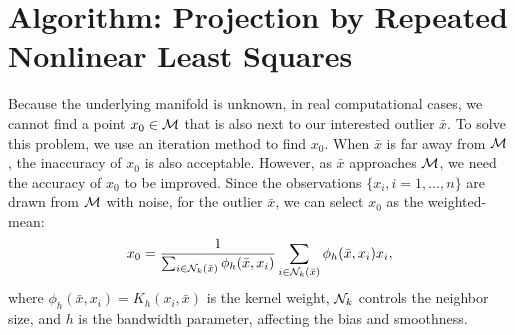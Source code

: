 \documentclass{article}
\newtheorem{theorem}{Theorem}[section]
\theoremstyle{remark}
\begin{document}
%
%
\section{Algorithm: Projection by Repeated Nonlinear Least Squares}\label{nonlinear projection}
Because the underlying manifold is unknown, in real computational cases,  we cannot find a point $x_0\in \cal M$ that is also next to our interested outlier $\bar{x}$. To solve this problem, we use an iteration method to find $x_0$. When $\bar{x}$ is far away from $\cal M$, the inaccuracy of $x_0$ is also acceptable. However, as $\bar{x}$ approaches $\cal M$, we need the accuracy of  $x_0$ to be improved.
Since the observations $\{x_i, i=1,...,n\}$ are drawn from $\cal M$ with noise, for the outlier $\bar{x}$, we can select $x_0$ as the weighted-mean:
\begin{equation}\label{weighted_mean}
x_0 =\frac{1}{\sum_{i\in {\cal N}_k(\bar{x}) } \phi_h(\bar{x},x_i)} \sum_{i\in {\cal N}_k (\bar{x})} \phi_h(\bar{x},x_i)x_i,
\end{equation}
where $\phi_h(\bar{x},x_i) = K_h(x_i, \bar{x})$ is the kernel weight, ${\cal N}_k$ controls the neighbor size, and $h$ is the bandwidth parameter, affecting the bias and smoothness.
\end{document}
